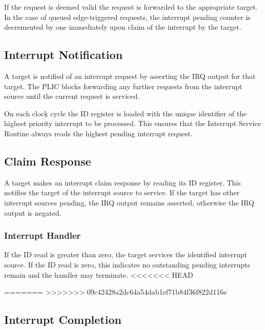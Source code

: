 If the request is deemed valid the request is forwarded to the
appropriate target. In the case of queued edge-triggered requests, the
interrupt pending counter is decremented by one immediately upon claim of the interrupt by the target.

\subsection{Interrupt Notification}

A target is notified of an interrupt request by asserting the IRQ output for that target.
The PLIC blocks forwarding any further requests from the interrupt source until the current request is serviced.

On each clock cycle the ID register is loaded with the unique identifier of the highest priority interrupt to be processed.
This ensures that the Interrupt Service Routine always reads the highest pending interrupt request.

\subsection{Claim Response} \label{sec:claim-response}

A target makes an interrupt claim response by reading its ID register.
This notifies the target of the interrupt source to service.
If the target has other interrupt sources pending, the IRQ output remains asserted, otherwise the IRQ output is negated.

\subsubsection{Interrupt Handler}

If the ID read is greater than zero, the target services the identified interrupt source.
If the ID read is zero, this indicates no outstanding pending interrupts remain and the handler may terminate.
<<<<<<< HEAD

=======
>>>>>>> 09c42428a2dc64a54dab1ef71b84f36f822d116e

\subsection{Interrupt Completion}

